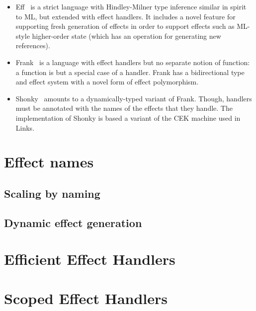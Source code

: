 \documentclass[a4paper,twoside,10pt]{amsart}
\begin{document}
\begin{itemize}
\item Eff~\cite{BauerP15} is a strict language with Hindley-Milner
  type inference similar in spirit to ML, but extended with effect
  handlers.
%
  It includes a novel feature for supporting fresh generation of
  effects in order to support effects such as ML-style higher-order
  state (which has an operation for generating new references).

\item Frank~\cite{LindleyMM16} is a language with effect handlers but
  no separate notion of function: a function is but a special case of
  a handler. Frank has a bidirectional type and effect system with a
  novel form of effect polymorphism.
  

\item Shonky~\cite{McBride16} amounts to a dynamically-typed variant
  of Frank. Though, handlers must be annotated with the names of the
  effects that they handle. The implementation of Shonky is based a
  variant of the CEK machine used in Links.
\end{itemize}

\section{Effect names}
\subsection{Scaling by naming}
\subsection{Dynamic effect generation}

\section{Efficient Effect Handlers}

\section{Scoped Effect Handlers}

\nocite{*}


\end{document}
